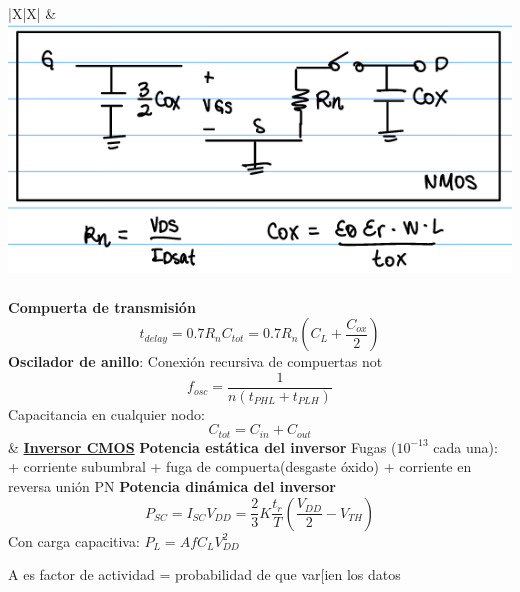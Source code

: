 \documentclass[../main.tex]{subfiles}
\begin{document}
\begin{xltabular}{\textwidth}{|X|X|}
	&
	\includegraphics[scale=0.5]{assets/digital-model}
	\\
	\hline
	\\
	\hline
	\textbf{Compuerta de transmisión}\newline
	$$t_{delay} = 0.7 R_nC_{tot} = 0.7 R_n (C_L + \frac{C_{ox}}{2})$$
	\newline
	\textbf{Oscilador de anillo}: Conexión recursiva de compuertas not
	$$f_{osc} = \frac{1}{n(t_{PHL} + t_{PLH})}$$
	Capacitancia en cualquier nodo:
	$$C_{tot} = C_{in} + C_{out}$$
	&
	\underline{\textbf{Inversor CMOS}}\newline
	\textbf{Potencia estática del inversor}
	Fugas ($10^{-13}$ cada una):\newline
	+ corriente subumbral
	+ fuga de compuerta(desgaste óxido)
	+ corriente en reversa unión PN \newline
	\textbf{Potencia dinámica del inversor}\newline
	$$P_{SC} = I_{SC} V_{DD} = \frac{2}{3}K\frac{t_r}{T}\left(\frac{V_{DD}}{2} - V_{TH}\right)$$
	Con carga capacitiva: $P_L = AfC_LV_{DD}^2$\newline

	A es factor de actividad = probabilidad de que var[ien los datos


	\\
	\hline
\end{xltabular}
\end{document}
